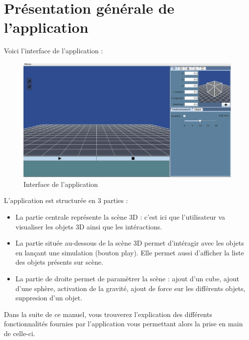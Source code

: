 \documentclass[11pt]{report}
\begin{document}


\chapter{Présentation générale de l'application}

Voici l'interface de l'application :

\begin{figure}[h]
  \centering
  \includegraphics[scale=0.4]{./interface.png}
  \caption{Interface de l'application}
\end{figure}

L'application est structurée en 3 parties :
\begin{itemize}
  \item La partie centrale représente la scène 3D : c'est ici que l'utilisateur va visualiser
  les objets 3D ainsi que les intéractions.
  \item La partie située au-dessous de la scène 3D permet d'intéragir avec les objets en
  lançant une simulation (bouton play). Elle permet aussi d'afficher la liste des objets présents
  sur scène.
  \item La partie de droite permet de paramètrer la scène : ajout d'un cube, ajout d'une sphère,
  activation de la gravité, ajout de force sur les différents objets, suppresion d'un objet.\newline
\end{itemize}


Dans la suite de ce manuel, vous trouverez l'explication des différents fonctionnalités fournies
par l'application vous permettant alors la prise en main de celle-ci.
\end{document}
